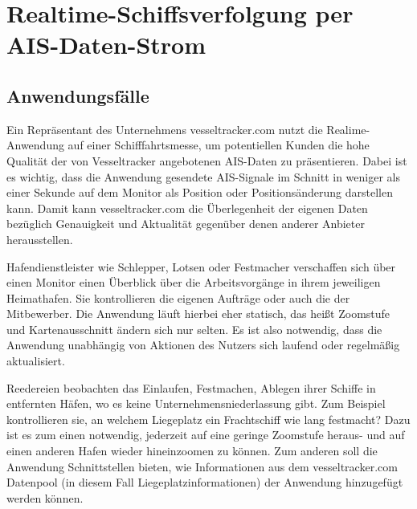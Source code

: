 \chapter{Realtime-Schiffsverfolgung per AIS-Daten-Strom}\label{c.Realtime-Schiffsverfolgung per AIS-Daten-Strom}

\section{ Anwendungsfälle}\label{s.Anwendungsfälle}

Ein Repräsentant des Unternehmens vesseltracker.com nutzt die Realime-Anwendung auf einer Schifffahrtsmesse, um potentiellen Kunden die hohe Qualität der von Vesseltracker angebotenen AIS-Daten zu präsentieren. Dabei ist es wichtig, dass die Anwendung gesendete AIS-Signale im Schnitt in weniger als einer Sekunde auf dem Monitor als Position oder Positionsänderung darstellen kann. Damit kann vesseltracker.com die Überlegenheit der eigenen Daten bezüglich Genauigkeit und Aktualität gegenüber denen anderer Anbieter herausstellen.

Hafendienstleister wie Schlepper, Lotsen oder Festmacher verschaffen sich über einen Monitor einen Überblick über die Arbeitsvorgänge in ihrem jeweiligen Heimathafen. Sie kontrollieren die eigenen Aufträge oder auch die der Mitbewerber.
Die Anwendung läuft hierbei eher statisch, das heißt Zoomstufe und Kartenausschnitt ändern sich nur selten. Es ist also notwendig, dass die Anwendung unabhängig von Aktionen des Nutzers sich laufend oder regelmäßig aktualisiert.

Reedereien beobachten das Einlaufen, Festmachen, Ablegen ihrer Schiffe in entfernten Häfen, wo es keine Unternehmensniederlassung gibt. Zum Beispiel kontrollieren sie, an welchem Liegeplatz ein Frachtschiff wie lang festmacht?
Dazu ist es zum einen notwendig, jederzeit auf eine geringe Zoomstufe heraus- und auf einen anderen Hafen wieder hineinzoomen zu können. Zum anderen soll die Anwendung Schnittstellen bieten, wie Informationen aus dem vesseltracker.com Datenpool (in diesem Fall Liegeplatzinformationen) der Anwendung hinzugefügt werden können.






